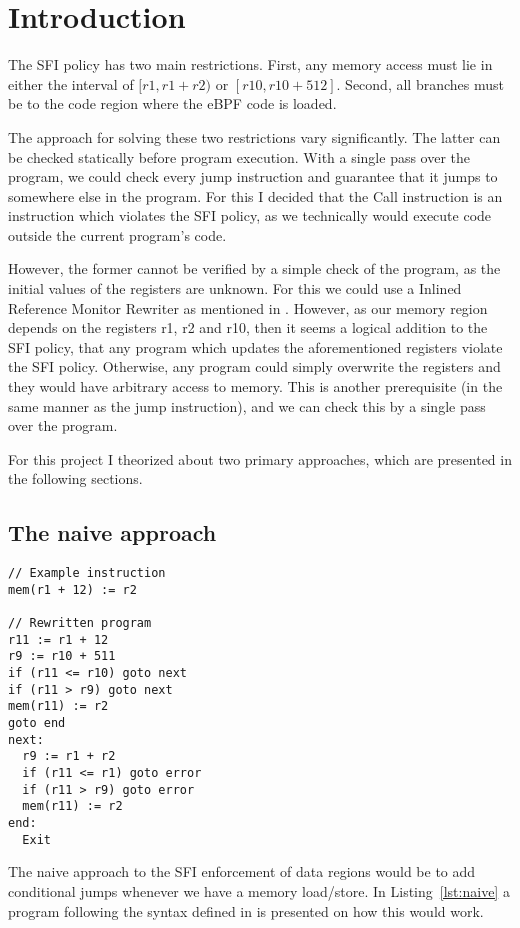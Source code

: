 \section{Introduction}\label{sec:introduction}
The SFI policy has two main restrictions. First, any memory access must lie in
either the interval of $[r1, r1 + r2)$ or $[r10, r10+512]$. Second, all
branches must be to the code region where the eBPF code is loaded.

The approach for solving these two restrictions vary significantly. The latter
can be checked statically before program execution. With a single pass over the
program, we could check every jump instruction and guarantee that it jumps to
somewhere else in the program. For this I decided that the Call instruction is
an instruction which violates the SFI policy, as we technically would execute
code outside the current program's code. 

However, the former cannot be verified by a simple check of the program, as the
initial values of the registers are unknown. For this we could use a Inlined
Reference Monitor Rewriter as mentioned in \cite{SFI}. However, as our memory
region depends on the registers r1, r2 and r10, then it seems a logical
addition to the SFI policy, that any program which updates the aforementioned
registers violate the SFI policy. Otherwise, any program could simply overwrite
the registers and they would have arbitrary access to memory. This is another
prerequisite (in the same manner as the jump instruction), and we can check
this by a single pass over the program.

For this project I theorized about two primary approaches, which are presented in the following sections.

\subsection{The naive approach}
\begin{lstlisting}[caption={Example program}, label={lst:naive}]
// Example instruction
mem(r1 + 12) := r2

// Rewritten program
r11 := r1 + 12
r9 := r10 + 511
if (r11 <= r10) goto next
if (r11 > r9) goto next
mem(r11) := r2
goto end
next:
  r9 := r1 + r2
  if (r11 <= r1) goto error
  if (r11 > r9) goto error
  mem(r11) := r2
end:
  Exit
\end{lstlisting}
The naive approach to the SFI enforcement of data regions would be to add
conditional jumps whenever we have a memory load/store. In
Listing~\ref{lst:naive} a program following the syntax defined in \cite{SFI} is
presented on how this would work.

